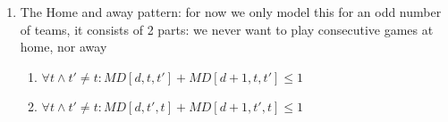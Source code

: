 \documentclass[titlepage]{article}%
\begin{document}
\begin{enumerate}
 \item The Home and away pattern: for now we only model this for an odd number of teams, it consists of 2 parts: we never want to play consecutive games at home, nor away
 \begin{enumerate}
  \item $\forall t \land t'\neq t: MD[d,t,t'] + MD[d+1,t,t'] \leq 1$
  \item $\forall t \land t'\neq t: MD[d,t',t] + MD[d+1,t',t] \leq 1$
 \end{enumerate}
\end{enumerate}   
\end{document}
